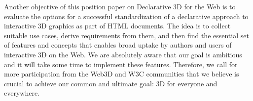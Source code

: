 \documentclass{acmsiggraph}
\begin{document}
Another objective of this position paper on Declarative 3D for the Web is to evaluate the options for a successful standardization of a declarative approach to interactive 3D graphics as part of HTML documents. The idea is to collect suitable use cases, derive requirements from them, and then find the essential set of features and concepts that enables broad uptake by authors and users of interactive 3D on the Web.
We are absolutely aware that our goal is ambitious and it will take some time to implement these features. Therefore, we call for more participation from the Web3D and W3C communities that we believe is crucial to achieve our common and ultimate goal: 3D for everyone and everywhere.





\end{document}
